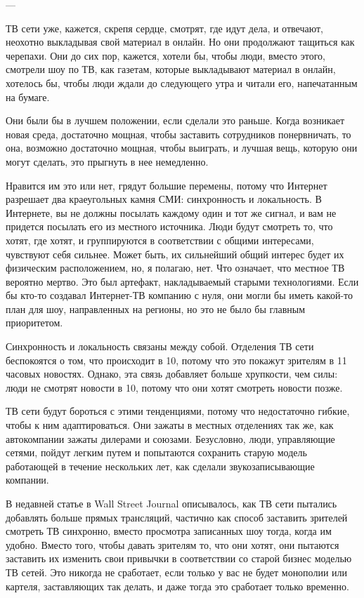 \documentclass[ebook,12pt,oneside,openany]{memoir}
\begin{document}
---

ТВ сети уже, кажется, скрепя сердце, смотрят, где идут дела, и
отвечают, неохотно выкладывая свой материал в онлайн. Но они
продолжают тащиться как черепахи. Они до сих пор, кажется, хотели бы,
чтобы люди, вместо этого, смотрели шоу по ТВ, как газетам, которые
выкладывают материал в онлайн, хотелось бы, чтобы люди ждали до
следующего утра и читали его, напечатанным на бумаге.

Они были бы в лучшем положении, если сделали это раньше. Когда
возникает новая среда, достаточно мощная, чтобы заставить сотрудников
понервничать, то она, возможно достаточно мощная, чтобы выиграть, и
лучшая вещь, которую они могут сделать, это прыгнуть в нее немедленно.


Нравится им это или нет, грядут большие перемены, потому что Интернет
разрешает два краеугольных камня СМИ: синхронность и локальность. В
Интернете, вы не должны посылать каждому один и тот же сигнал, и вам
не придется посылать его из местного источника. Люди будут смотреть
то, что хотят, где хотят, и группируются в соответствии с общими
интересами, чувствуют себя сильнее. Может быть, их сильнейший общий
интерес будет их физическим расположением, но, я полагаю, нет. Что
означает, что местное ТВ вероятно мертво. Это был артефакт,
накладываемый старыми технологиями. Если бы кто-то создавал
Интернет-ТВ компанию с нуля, они могли бы иметь какой-то план для шоу,
направленных на регионы, но это не было бы главным приоритетом.

Синхронность и локальность связаны между собой. Отделения ТВ сети
беспокоятся о том, что происходит в 10, потому что это покажут
зрителям в 11 часовых новостях. Однако, эта связь добавляет больше
хрупкости, чем силы: люди не смотрят новости в 10, потому что они
хотят смотреть новости позже.


ТВ сети будут бороться с этими тенденциями, потому что недостаточно
гибкие, чтобы к ним адаптироваться. Они зажаты в местных отделениях
так же, как автокомпании зажаты дилерами и союзами. Безусловно, люди,
управляющие сетями, пойдут легким путем и попытаются сохранить старую
модель работающей в течение нескольких лет, как сделали
звукозаписывающие компании.

В недавней статье в Wall Street Journal описывалось, как ТВ сети
пытались добавлять больше прямых трансляций, частично как способ
заставить зрителей смотреть ТВ синхронно, вместо просмотра записанных
шоу тогда, когда им удобно. Вместо того, чтобы давать зрителям то, что
они хотят, они пытаются заставить их изменить свои привычки в
соответствии со старой бизнес моделью ТВ сетей. Это никогда не
сработает, если только у вас не будет монополии или картеля,
заставляющих так делать, и даже тогда это сработает только временно.
\end{document}
